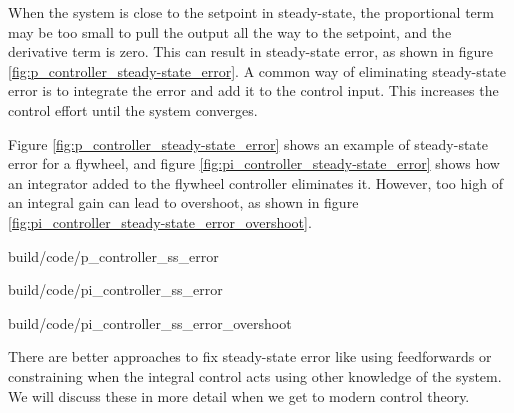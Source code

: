 When the \gls{system} is close to the \gls{setpoint} in steady-state, the
proportional term may be too small to pull the \gls{output} all the way to the
\gls{setpoint}, and the derivative term is zero. This can result in
\gls{steady-state error}, as shown in figure
\ref{fig:p_controller_steady-state_error}. A common way of eliminating
\gls{steady-state error} is to integrate the error and add it to the
\gls{control input}. This increases the \gls{control effort} until the
\gls{system} converges.

Figure \ref{fig:p_controller_steady-state_error} shows an example of
\gls{steady-state error} for a flywheel, and figure
\ref{fig:pi_controller_steady-state_error} shows how an integrator added to the
flywheel controller eliminates it. However, too high of an integral gain can
lead to overshoot, as shown in figure
\ref{fig:pi_controller_steady-state_error_overshoot}.

\begin{bookfigure}
  \begin{minisvg}{build/code/p_controller_ss_error}
    \caption{P controller with steady-state error}
    \label{fig:p_controller_steady-state_error}
  \end{minisvg}
  \hfill
  \begin{minisvg}{build/code/pi_controller_ss_error}
    \caption{PI controller that eliminates steady-state error}
    \label{fig:pi_controller_steady-state_error}
  \end{minisvg}
  \hfill
  \begin{minisvg}{build/code/pi_controller_ss_error_overshoot}
    \caption{PI controller with overshoot from a large $K_i$ value}
    \label{fig:pi_controller_steady-state_error_overshoot}
  \end{minisvg}
\end{bookfigure}

There are better approaches to fix \gls{steady-state error} like using
feedforwards or constraining when the integral control acts using other
knowledge of the \gls{system}. We will discuss these in more detail when we get
to modern control theory.
